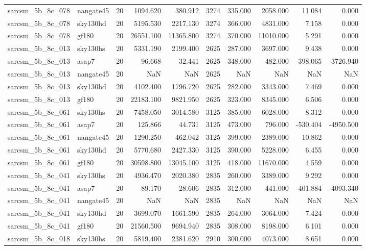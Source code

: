 \documentclass{article}
\begin{document}
\begin{longtable}{llrrrrrrrr}
sarcsm\_5b\_8c\_078 & nangate45 & 20 & 1094.620 & 380.912 & 3274 & 335.000 & 2058.000 & 11.084 & 0.000 \\
sarcsm\_5b\_8c\_078 & sky130hd & 20 & 5195.530 & 2217.130 & 3274 & 366.000 & 4831.000 & 7.158 & 0.000 \\
sarcsm\_5b\_8c\_078 & gf180 & 20 & 26551.100 & 11365.800 & 3274 & 370.000 & 11010.000 & 5.291 & 0.000 \\
sarcsm\_5b\_8c\_013 & sky130hs & 20 & 5331.190 & 2199.400 & 2625 & 287.000 & 3697.000 & 9.438 & 0.000 \\
sarcsm\_5b\_8c\_013 & asap7 & 20 & 96.668 & 32.441 & 2625 & 348.000 & 482.000 & -398.065 & -3726.940 \\
sarcsm\_5b\_8c\_013 & nangate45 & 20 & NaN & NaN & 2625 & NaN & NaN & NaN & NaN \\
sarcsm\_5b\_8c\_013 & sky130hd & 20 & 4102.400 & 1796.720 & 2625 & 282.000 & 3343.000 & 7.469 & 0.000 \\
sarcsm\_5b\_8c\_013 & gf180 & 20 & 22183.100 & 9821.950 & 2625 & 323.000 & 8345.000 & 6.506 & 0.000 \\
sarcsm\_5b\_8c\_061 & sky130hs & 20 & 7458.050 & 3014.580 & 3125 & 385.000 & 6028.000 & 8.312 & 0.000 \\
sarcsm\_5b\_8c\_061 & asap7 & 20 & 125.866 & 44.731 & 3125 & 473.000 & 796.000 & -530.404 & -4950.500 \\
sarcsm\_5b\_8c\_061 & nangate45 & 20 & 1290.250 & 462.042 & 3125 & 399.000 & 2389.000 & 10.862 & 0.000 \\
sarcsm\_5b\_8c\_061 & sky130hd & 20 & 5770.680 & 2427.330 & 3125 & 390.000 & 5228.000 & 6.455 & 0.000 \\
sarcsm\_5b\_8c\_061 & gf180 & 20 & 30598.800 & 13045.100 & 3125 & 418.000 & 11670.000 & 4.559 & 0.000 \\
sarcsm\_5b\_8c\_041 & sky130hs & 20 & 4936.470 & 2020.380 & 2835 & 260.000 & 3389.000 & 9.292 & 0.000 \\
sarcsm\_5b\_8c\_041 & asap7 & 20 & 89.170 & 28.606 & 2835 & 312.000 & 441.000 & -401.884 & -4093.340 \\
sarcsm\_5b\_8c\_041 & nangate45 & 20 & NaN & NaN & 2835 & NaN & NaN & NaN & NaN \\
sarcsm\_5b\_8c\_041 & sky130hd & 20 & 3699.070 & 1661.590 & 2835 & 264.000 & 3064.000 & 7.424 & 0.000 \\
sarcsm\_5b\_8c\_041 & gf180 & 20 & 21560.500 & 9694.940 & 2835 & 308.000 & 8198.000 & 6.101 & 0.000 \\
sarcsm\_5b\_8c\_018 & sky130hs & 20 & 5819.400 & 2381.620 & 2910 & 300.000 & 4073.000 & 8.651 & 0.000 \\

\end{longtable}
\end{document}
